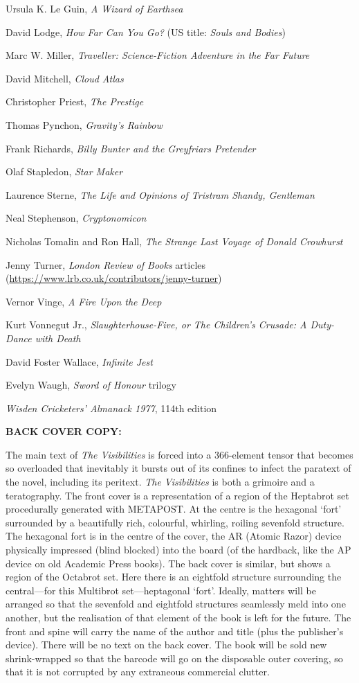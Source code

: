 Ursula K. Le Guin, {\sl A Wizard of Earthsea}\par
David Lodge, {\sl How Far Can You Go?} (US title: {\sl Souls and Bodies})\par
Marc W. Miller, {\sl Traveller: Science-Fiction Adventure in the Far Future}\par
David Mitchell, {\sl Cloud Atlas}\par
Christopher Priest, {\sl The Prestige}\par
Thomas Pynchon, {\sl Gravity's Rainbow}\par
Frank Richards, {\sl Billy Bunter and the Greyfriars Pretender}\par
Olaf Stapledon, {\sl Star Maker}\par
Laurence Sterne, {\sl The Life and Opinions of Tristram Shandy, Gentleman}\par
Neal Stephenson, {\sl Cryptonomicon}\par
Nicholas Tomalin and Ron Hall, {\sl The Strange Last Voyage of Donald Crowhurst}\par
Jenny Turner, {\sl London Review of Books} articles (\url{https://www.lrb.co.uk/contributors/jenny-turner})\par
Vernor Vinge, {\sl A Fire Upon the Deep}\par
Kurt Vonnegut Jr., {\sl Slaughterhouse-Five, or The Children's Crusade: A Duty-Dance with Death}\par
David Foster Wallace, {\sl Infinite Jest}\par
Evelyn Waugh, {\sl Sword of Honour} trilogy\par
{\sl Wisden Cricketers' Almanack 1977}, 114th edition\par
\bigskip

{\bf BACK COVER COPY:}\par
The main text of {\sl The Visibilities} is forced into a 366-element tensor that becomes so overloaded that inevitably it bursts out of its confines to infect the paratext of the novel, including its peritext. {\sl The Visibilities} is both a grimoire and a teratography. The front cover is a representation of a region of the Heptabrot set procedurally generated with METAPOST. At the centre is the hexagonal ‘fort’ surrounded by a beautifully rich, colourful, whirling, roiling sevenfold structure. The hexagonal fort is in the centre of the cover, the AR (Atomic Razor) device physically impressed (blind blocked) into the board (of the hardback, like the AP device on old Academic Press books). The back cover is similar, but shows a region of the Octabrot set. Here there is an eightfold structure surrounding the central—for this Multibrot set—heptagonal ‘fort’. Ideally, matters will be arranged so that the sevenfold and eightfold structures seamlessly meld into one another, but the realisation of that element of the book is left for the future. The front and spine will carry the name of the author and title (plus the publisher's device). There will be no text on the back cover. The book will be sold new shrink-wrapped so that the barcode will go on the disposable outer covering, so that it is not corrupted by any extraneous commercial clutter.\par
\bigskip

\bye
